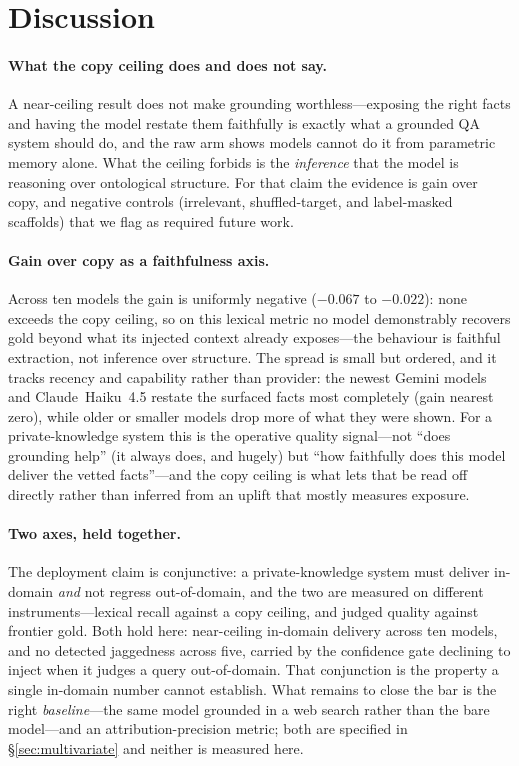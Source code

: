 \documentclass[11pt]{article}
\begin{document}
\section{Discussion}
\paragraph{What the copy ceiling does and does not say.}
A near-ceiling result does not make grounding worthless---exposing the right facts and having the
model restate them faithfully is exactly what a grounded QA system should do, and the raw arm
shows models cannot do it from parametric memory alone. What the ceiling forbids is the
\emph{inference} that the model is reasoning over ontological structure. For that claim the
evidence is gain over copy, and negative controls (irrelevant, shuffled-target, and label-masked
scaffolds) that we flag as required future work.

\paragraph{Gain over copy as a faithfulness axis.}
Across ten models the gain is uniformly negative ($-0.067$ to $-0.022$): none exceeds the copy
ceiling, so on this lexical metric no model demonstrably recovers gold beyond what its injected
context already exposes---the behaviour is faithful extraction, not inference over structure. The
spread is small but ordered, and it tracks recency and capability rather than provider: the newest
Gemini models and Claude~Haiku~4.5 restate the surfaced facts most completely (gain nearest zero),
while older or smaller models drop more of what they were shown. For a private-knowledge system
this is the operative quality signal---not ``does grounding help'' (it always does, and hugely)
but ``how faithfully does this model deliver the vetted facts''---and the copy ceiling is what lets
that be read off directly rather than inferred from an uplift that mostly measures exposure.

\paragraph{Two axes, held together.} The deployment claim is conjunctive: a private-knowledge
system must deliver in-domain \emph{and} not regress out-of-domain, and the two are measured on
different instruments---lexical recall against a copy ceiling, and judged quality against frontier
gold. Both hold here: near-ceiling in-domain delivery across ten models, and no detected jaggedness
across five, carried by the confidence gate declining to inject when it judges a query
out-of-domain. That conjunction is the property a single in-domain number cannot establish. What
remains to close the bar is the right \emph{baseline}---the same model grounded in a web search
rather than the bare model---and an attribution-precision metric; both are specified in
\S\ref{sec:multivariate} and neither is measured here.
\end{document}
